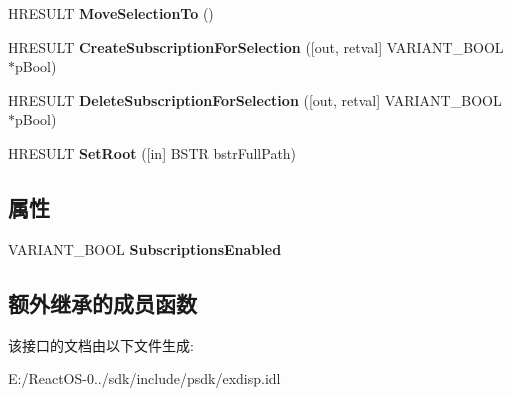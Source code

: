 \begin{DoxyCompactItemize}
\item 
\mbox{\label{interface_s_h_doc_vw_1_1_i_shell_favorites_name_space_ac8299eb4a5e9c2d24de1385c4ac1a828}} 
H\+R\+E\+S\+U\+LT {\bfseries Move\+Selection\+To} ()
\item 
\mbox{\label{interface_s_h_doc_vw_1_1_i_shell_favorites_name_space_a511aea4dc935681027c84ab71f02eac9}} 
H\+R\+E\+S\+U\+LT {\bfseries Create\+Subscription\+For\+Selection} (\mbox{[}out, retval\mbox{]} V\+A\+R\+I\+A\+N\+T\+\_\+\+B\+O\+OL $\ast$p\+Bool)
\item 
\mbox{\label{interface_s_h_doc_vw_1_1_i_shell_favorites_name_space_a047495f43f73f9b7b9c9fbda4e0bcbb6}} 
H\+R\+E\+S\+U\+LT {\bfseries Delete\+Subscription\+For\+Selection} (\mbox{[}out, retval\mbox{]} V\+A\+R\+I\+A\+N\+T\+\_\+\+B\+O\+OL $\ast$p\+Bool)
\item 
\mbox{\label{interface_s_h_doc_vw_1_1_i_shell_favorites_name_space_a93a2685f3cb8ad44f2fd540e20a16a93}} 
H\+R\+E\+S\+U\+LT {\bfseries Set\+Root} (\mbox{[}in\mbox{]} B\+S\+TR bstr\+Full\+Path)
\end{DoxyCompactItemize}
\subsection*{属性}
\begin{DoxyCompactItemize}
\item 
\mbox{\label{interface_s_h_doc_vw_1_1_i_shell_favorites_name_space_af0df3742aad44c4da3b33cc0451c0502}} 
V\+A\+R\+I\+A\+N\+T\+\_\+\+B\+O\+OL {\bfseries Subscriptions\+Enabled}
\end{DoxyCompactItemize}
\subsection*{额外继承的成员函数}


该接口的文档由以下文件生成\+:\begin{DoxyCompactItemize}
\item 
E\+:/\+React\+O\+S-\/0../sdk/include/psdk/exdisp.\+idl\end{DoxyCompactItemize}
